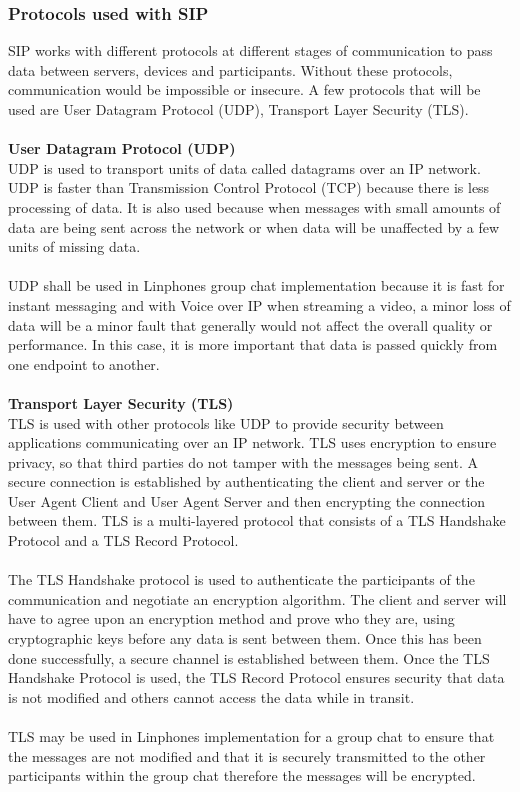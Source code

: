 \documentclass[a4paper]{article}
\begin{document}
\subsubsection{Protocols used with SIP}
SIP works with different protocols at different stages of communication to pass data between servers, devices and participants. Without these protocols, communication would be impossible or insecure. A few protocols that will be used are User Datagram Protocol (UDP), Transport Layer Security (TLS).\\
\\
\textbf{User Datagram Protocol (UDP)\\}
UDP is used to transport units of data called datagrams over an IP network. UDP is faster than Transmission Control Protocol (TCP) because there is less processing of data. It is also used because when messages with small amounts of data are being sent across the network or when data will be unaffected by a few units of missing data.\\
\\
UDP shall be used in Linphones group chat implementation because it is fast for instant messaging and with Voice over IP when streaming a video, a minor loss of data will be a minor fault that generally would not affect the overall quality or performance. In this case, it is more important that data is passed quickly from one endpoint to another.\\
\\

\textbf{\large Transport Layer Security (TLS)\\}
TLS is used with other protocols like UDP to provide security between applications communicating over an IP network. TLS uses encryption to ensure privacy, so that third parties do not tamper with the messages being sent. A secure connection is established by authenticating the client and server or the User Agent Client and User Agent Server and then encrypting the connection between them. TLS is a multi-layered protocol that consists of a TLS Handshake Protocol and a TLS Record Protocol.\\
\\
The TLS Handshake protocol is used to authenticate the participants of the communication and negotiate an encryption algorithm. The client and server will have to agree upon an encryption method and prove who they are, using cryptographic keys before any data is sent between them. Once this has been done successfully, a secure channel is established between them. Once the TLS Handshake Protocol is used, the TLS Record Protocol ensures security that data is not modified and others cannot access the data while in transit.\\ 
\\
TLS may be used in Linphones implementation for a group chat to ensure that the messages are not modified and that it is securely transmitted to the other participants within the group chat therefore  the messages will be encrypted.\\
\\
\end{document}
